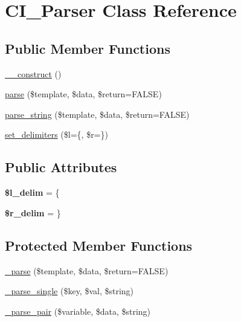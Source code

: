 \hypertarget{class_c_i___parser}{}\section{C\+I\+\_\+\+Parser Class Reference}
\label{class_c_i___parser}
\subsection*{Public Member Functions}
\begin{DoxyCompactItemize}
\item 
\mbox{\hyperlink{class_c_i___parser_ab10eaec56333ec25c4af1a718b95e7a5}{\+\_\+\+\_\+construct}} ()
\item 
\mbox{\hyperlink{class_c_i___parser_a5a5b48f3f63f47d47cf581f48da3c962}{parse}} (\$template, \$data, \$return=F\+A\+L\+SE)
\item 
\mbox{\hyperlink{class_c_i___parser_a285dcbd53a4ed0a42e4d56b94ecb9300}{parse\+\_\+string}} (\$template, \$data, \$return=F\+A\+L\+SE)
\item 
\mbox{\hyperlink{class_c_i___parser_a4f0dd39e8583cfb23856c512d403dee0}{set\+\_\+delimiters}} (\$l=\textquotesingle{}\{\textquotesingle{}, \$r=\textquotesingle{}\}\textquotesingle{})
\end{DoxyCompactItemize}
\subsection*{Public Attributes}
\begin{DoxyCompactItemize}
\item 
\mbox{\label{class_c_i___parser_ab80cdb8c09b1c69563594f70f7813a38}} 
{\bfseries \$l\+\_\+delim} = \textquotesingle{}\{\textquotesingle{}
\item 
\mbox{\label{class_c_i___parser_af2dc6a4faf4a1da57b420a307287a176}} 
{\bfseries \$r\+\_\+delim} = \textquotesingle{}\}\textquotesingle{}
\end{DoxyCompactItemize}
\subsection*{Protected Member Functions}
\begin{DoxyCompactItemize}
\item 
\mbox{\hyperlink{class_c_i___parser_a55e181f6bcc8e94d023b0ec3f72adf32}{\+\_\+parse}} (\$template, \$data, \$return=F\+A\+L\+SE)
\item 
\mbox{\hyperlink{class_c_i___parser_a63fc992803439fcd1fdf67f68d41098e}{\+\_\+parse\+\_\+single}} (\$key, \$val, \$string)
\item 
\mbox{\hyperlink{class_c_i___parser_ad013fc6a35430e97ba0e5c60b254b4dc}{\+\_\+parse\+\_\+pair}} (\$variable, \$data, \$string)
\end{DoxyCompactItemize}
